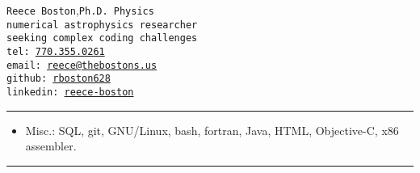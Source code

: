\documentclass[11pt, letter]{article}
\begin{document}
\begin{multicols}{2}
 \noindent %
 {\tt \huge  Reece Boston},\hfill{\tt \large Ph.D.~Physics}\\%
	{\tt\small numerical astrophysics researcher\hfill\drawplanet}\\
	{\tt\small seeking complex coding challenges\hfill\drawcalculator\hspace{1pt}\mbox{}}
%
 \columnbreak\\
 \mbox{}\hfill{\tt  \small tel: \href{tel:770-355-0261}{770.355.0261}\hphantom{aaaaaaa}}\\  %
 \mbox{}\hfill{\tt  \small email: \href{mailto:Reece@thebostons.us}{reece@thebostons.us}}\\ %
 \mbox{}\hfill{\tt  \small github: \href{https://github.com/rboston628}{rboston628}\hphantom{aaaaaaaaa}}\\%
 \mbox{}\hfill{\tt  \small linkedin: \href{https://www.linkedin.com/in/reece-boston-752046117/}{reece-boston}\hphantom{aaaaaaa}}%
\end{multicols}

\hrule
\begin{itemize}
		\item Misc.: SQL,  git,  GNU/Linux, bash, fortran, Java, HTML, Objective-C, x86 assembler.
	\end{itemize}
\hrule

\vspace{-0.5\baselineskip}
\end{document}
